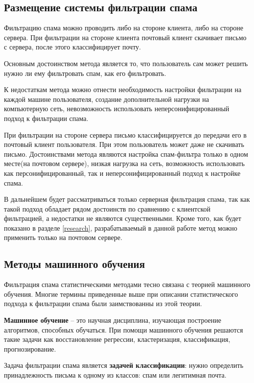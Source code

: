 \subsection{Размещение системы фильтрации  спама}
Фильтрацию спама можно проводить либо на стороне клиента, либо на стороне сервера. 
При фильтрации на стороне клиента почтовый клиент скачивает письмо с сервера, после этого классифицирует почту. 

Основным достоинством метода является то, что пользователь сам может решить нужно ли ему фильтровать спам, как его фильтровать.

К недостаткам метода можно отнести необходимость настройки фильтрации на каждой машине пользователя, создание  дополнительной нагрузки на компьютерную сеть, невозможность использовать неперсонифицированный подход к фильтрации спама.


При фильтрации на стороне сервера письмо классифицируется до передачи его в почтовый клиент пользователя. При этом пользователь может даже не скачивать письмо. Достоинствами метода являются настройка спам-фильтра только в одном месте(на почтовом сервере), низкая нагрузка на сеть, возможность использовать как персонифицированный, так и неперсонифицированный подход к настройке спама.

В дальнейшем будет рассматриваться только серверная фильтрация спама, так как такой подход обладает рядом достоинств по сравнению с клиентской фильтрацией, а недостатки не являются существенными. Кроме того, как будет показано в разделе \ref{research}, разрабатываемый в данной работе метод можно применить только на почтовом сервере.



\subsection{Методы машинного обучения}
Фильтрация спама статистическими методами тесно связана с теорией машинного обучения. Многие термины приведенные выше при описании статистического подхода к фильтрации спама были заимствованны из этой теории.


\textbf{Машинное обучение} – это научная дисциплина, изучающая построение алгоритмов, способных обучаться\cite{VORONCOV}. При помощи машинного обучения решаются такие задачи как восстановление регрессии, кластеризация, классификация, прогнозирование.  

Задача фильтрации спама является \textbf{задачей классификации}: нужно определить принадлежность письма к одному из классов: спам или легитимная почта.

